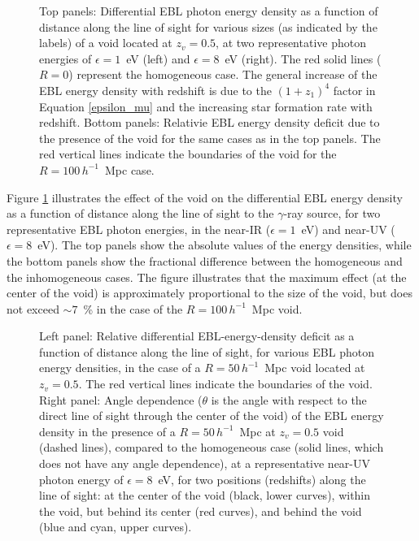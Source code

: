 \documentclass{aastex6}
\begin{document}
\begin{figure}[ht]
\caption{Top panels: Differential EBL photon energy density as a function of distance along the line of
sight for various sizes (as indicated by the labels) of a void located at $z_v = 0.5$, at two representative
photon energies of $\epsilon = 1$~eV (left) and $\epsilon = 8$~eV (right). The red solid lines ($R = 0$) 
represent the homogeneous case. The general increase of the EBL energy density with redshift is due to the 
$(1 + z_1)^4$ factor in Equation \ref{epsilon_mu} and the increasing star formation rate with redshift. 
Bottom panels: Relativie EBL energy density deficit due to the presence of the void for the same cases
as in the top panels. The red vertical lines indicate the boundaries of the void for the 
$R = 100 \, h^{-1}$~Mpc case.
\label{fig:EBLdensities2} }
\end{figure}

Figure \ref{fig:EBLdensities2} illustrates the effect of the void on the differential EBL energy density
as a function of distance along the line of sight to the $\gamma$-ray source, for two representative EBL
photon energies, in the near-IR ($\epsilon = 1$~eV) and near-UV ($\epsilon = 8$~eV). 
The top panels show the absolute values of the energy densities, while the bottom panels show the 
fractional difference between the homogeneous and the inhomogeneous cases. The figure illustrates
that the maximum effect (at the center of the void) is approximately proportional to the size of the void,
but does not exceed $\sim 7$~\% in the case of the $R = 100 \, h^{-1}$~Mpc void. 


\begin{figure}[ht]
\caption{Left panel: Relative differential EBL-energy-density deficit as a function of distance along the line
of sight, for various EBL photon energy densities, in the case of a $R = 50 \, h^{-1}$~Mpc void located at
$z_v = 0.5$. The red vertical lines indicate the boundaries of the void. 
Right panel: Angle dependence ($\theta$ is the angle with respect to the direct line of sight through 
the center of the void) 
of the EBL energy density in the presence of a $R = 50 \, h^{-1}$~Mpc 
at $z_v = 0.5$ void (dashed lines), compared to the homogeneous case (solid lines, which does not have
any angle dependence), at a representative near-UV photon energy of $\epsilon = 8$~eV, for two positions 
(redshifts) along the line of sight: at the center of the void (black, lower curves), within the void, but
behind its center (red curves), and behind the void (blue and cyan, upper curves).
\label{fig:EBLdensities3} }
\end{figure}
\end{document}
